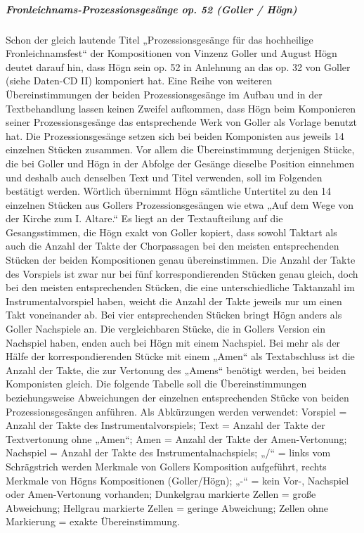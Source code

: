 \subparagraph{Fronleichnams-Prozessionsgesänge op. 52 (Goller / Högn)}
Schon der gleich lautende Titel „Prozessionsgesänge für das hochheilige
Fronleichnamsfest“ der Kompositionen von Vinzenz Goller und August Högn
deutet darauf hin, dass Högn sein op. 52 in Anlehnung an das op. 32 von
Goller (siehe Daten-CD II) komponiert hat. Eine Reihe von weiteren
Übereinstimmungen der beiden Prozessionsgesänge im Aufbau und in der
Textbehandlung lassen keinen Zweifel aufkommen, dass Högn beim
Komponieren seiner Prozessionsgesänge das entsprechende Werk von Goller
als Vorlage benutzt hat. Die Prozessionsgesänge setzen sich bei beiden
Komponisten aus jeweils 14 einzelnen Stücken zusammen. Vor allem die
Übereinstimmung derjenigen Stücke, die bei Goller und Högn in der
Abfolge der Gesänge dieselbe Position einnehmen und deshalb auch
denselben Text und Titel verwenden, soll im Folgenden bestätigt werden.
Wörtlich übernimmt Högn sämtliche Untertitel zu den 14 einzelnen
Stücken aus Gollers Prozessionsgesängen wie etwa „Auf dem Wege von der
Kirche zum I. Altare.“ Es liegt an der Textaufteilung auf die
Gesangsstimmen, die Högn exakt von Goller kopiert, dass sowohl Taktart
als auch die Anzahl der Takte der Chorpassagen bei den meisten
entsprechenden Stücken der beiden Kompositionen genau übereinstimmen.
Die Anzahl der Takte des Vorspiels ist zwar nur bei fünf
korrespondierenden Stücken genau gleich, doch bei den meisten
entsprechenden Stücken, die eine unterschiedliche Taktanzahl im
Instrumentalvorspiel haben, weicht die Anzahl der Takte jeweils nur um
einen Takt voneinander ab. Bei vier entsprechenden Stücken bringt Högn
anders als Goller Nachspiele an. Die vergleichbaren Stücke, die in
Gollers Version ein Nachspiel haben, enden auch bei Högn mit einem
Nachspiel. Bei mehr als der Hälfe der korrespondierenden Stücke mit
einem „Amen“ als Textabschluss ist die Anzahl der Takte, die zur
Vertonung des „Amens“ benötigt werden, bei beiden Komponisten gleich.
Die folgende Tabelle soll die Übereinstimmungen beziehungsweise
Abweichungen der einzelnen entsprechenden Stücke von beiden
Prozessionsgesängen anführen. Als Abkürzungen werden verwendet:
Vorspiel = Anzahl der Takte des Instrumentalvorspiels; Text = Anzahl
der Takte der Textvertonung ohne „Amen“; Amen = Anzahl der Takte der
Amen-Vertonung; Nachspiel = Anzahl der Takte des
Instrumentalnachspiels; „/“ = links vom Schrägstrich werden Merkmale
von Gollers Komposition aufgeführt, rechts Merkmale von Högns
Kompositionen (Goller/Högn); „-“ = kein Vor-, Nachspiel oder
Amen-Vertonung vorhanden; Dunkelgrau markierte Zellen = große
Abweichung; Hellgrau markierte Zellen = geringe Abweichung; Zellen ohne
Markierung = exakte Übereinstimmung.

